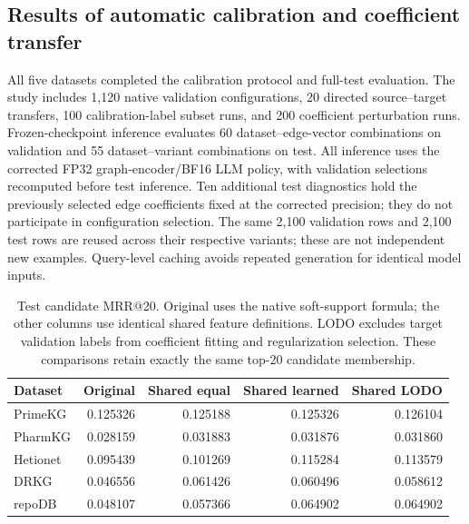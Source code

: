 \subsection{Results of automatic calibration and coefficient transfer}

All five datasets completed the calibration protocol and full-test evaluation.
The study includes 1,120 native validation configurations, 20 directed
source--target transfers, 100 calibration-label subset runs, and 200 coefficient
perturbation runs. Frozen-checkpoint inference evaluates 60 dataset--edge-vector
combinations on validation and 55 dataset--variant combinations on test.
All inference uses the corrected FP32 graph-encoder/BF16 LLM policy, with
validation selections recomputed before test inference. Ten additional
test diagnostics hold the previously selected edge coefficients fixed at the
corrected precision; they do not participate in configuration selection.
The same 2,100 validation rows and 2,100 test rows are reused across their
respective variants; these are not independent new examples. Query-level caching
avoids repeated generation for identical model inputs.

\begin{table}[t]
\centering
\caption{Test candidate MRR@20. Original uses the native soft-support formula;
the other columns use identical shared feature definitions. LODO excludes target
validation labels from coefficient fitting and regularization selection.
These comparisons retain exactly the same top-20 candidate membership.}
\label{tab:c2-candidate-calibration}
\begin{tabular}{lrrrr}
\hline
Dataset & Original & Shared equal & Shared learned & Shared LODO \\
\hline
PrimeKG  & 0.125326 & 0.125188 & 0.125326 & 0.126104 \\
PharmKG  & 0.028159 & 0.031883 & 0.031876 & 0.031860 \\
Hetionet & 0.095439 & 0.101269 & 0.115284 & 0.113579 \\
DRKG     & 0.046556 & 0.061426 & 0.060496 & 0.058612 \\
repoDB   & 0.048107 & 0.057366 & 0.064902 & 0.064902 \\
\hline
\end{tabular}
\end{table}

